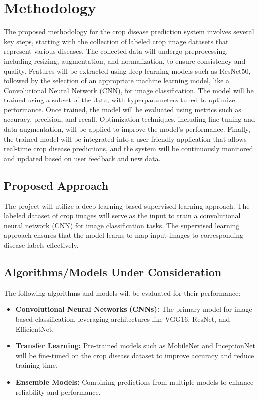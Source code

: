 \section{Methodology}
The proposed methodology for the crop disease prediction system involves several key steps, starting with the collection of labeled crop image datasets that represent various diseases. The collected data will undergo preprocessing, including resizing, augmentation, and normalization, to ensure consistency and quality. Features will be extracted using deep learning models such as ResNet50, followed by the selection of an appropriate machine learning model, like a Convolutional Neural Network (CNN), for image classification. The model will be trained using a subset of the data, with hyperparameters tuned to optimize performance. Once trained, the model will be evaluated using metrics such as accuracy, precision, and recall. Optimization techniques, including fine-tuning and data augmentation, will be applied to improve the model’s performance. Finally, the trained model will be integrated into a user-friendly application that allows real-time crop disease predictions, and the system will be continuously monitored and updated based on user feedback and new data.

\subsection{Proposed Approach}
The project will utilize a deep learning-based supervised learning approach. The labeled dataset of crop images will serve as the input to train a convolutional neural network (CNN) for image classification tasks. The supervised learning approach ensures that the model learns to map input images to corresponding disease labels effectively.

\subsection{Algorithms/Models Under Consideration}
The following algorithms and models will be evaluated for their performance:
\begin{itemize}
    \item \textbf{Convolutional Neural Networks (CNNs):} The primary model for image-based classification, leveraging architectures like VGG16, ResNet, and EfficientNet.
    \item \textbf{Transfer Learning:} Pre-trained models such as MobileNet and InceptionNet will be fine-tuned on the crop disease dataset to improve accuracy and reduce training time.
    \item \textbf{Ensemble Models:} Combining predictions from multiple models to enhance reliability and performance.
\end{itemize}


